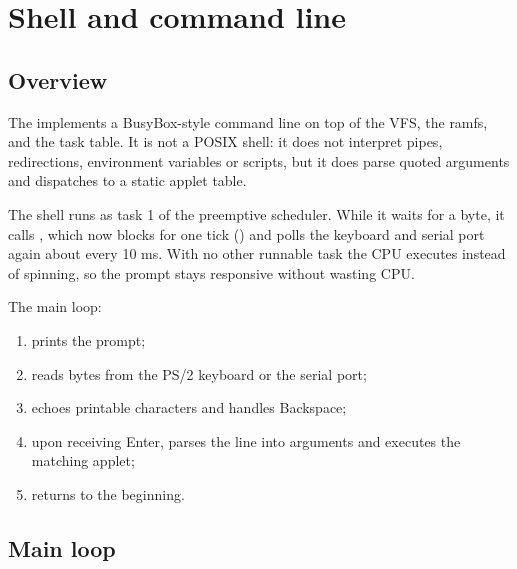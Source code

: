 \chapter{Shell and command line}
\label{cap:shell}

\section{Overview}

The  implements a BusyBox-style command line on top of the
VFS, the ramfs,  and the task table. It is not a POSIX shell:
it does not interpret pipes, redirections, environment variables or scripts,
but it does parse quoted arguments and dispatches to a static applet table.

The shell runs as task 1 of the preemptive scheduler. While it waits for a
byte, it calls , which now blocks for one tick
() and polls the keyboard and serial port again about
every 10 ms. With no other runnable task the CPU executes  instead
of spinning, so the prompt stays responsive without wasting CPU.

The main loop:

\begin{enumerate}
  \item prints the  prompt;
  \item reads bytes from the PS/2 keyboard or the serial port;
  \item echoes printable characters and handles Backspace;
  \item upon receiving Enter, parses the line into arguments and executes the
        matching applet;
  \item returns to the beginning.
\end{enumerate}

\section{Main loop}

